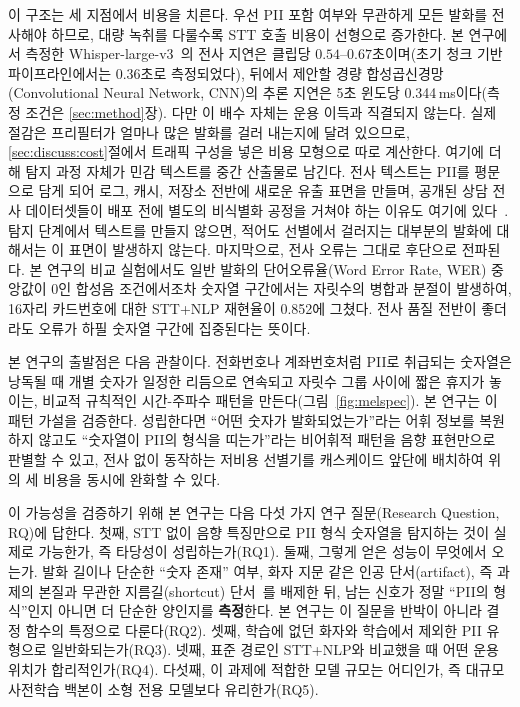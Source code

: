 \documentclass[11pt]{article}
\renewcommand{\emph}[1]{\textbf{#1}}
\begin{document}
이 구조는 세 지점에서 비용을 치른다. 우선 PII 포함 여부와 무관하게 모든 발화를 전사해야
하므로, 대량 녹취를 다룰수록 STT 호출 비용이 선형으로 증가한다. 본 연구에서 측정한
Whisper-large-v3~\cite{radford2023whisper}의 전사 지연은 클립당 $0.54$--$0.67$초이며(초기
청크 기반 파이프라인에서는 $0.36$초로 측정되었다), 뒤에서
제안할 경량 합성곱신경망(Convolutional Neural Network, CNN)의 추론 지연은 5초 윈도당
0.344\,ms이다(측정 조건은 \ref{sec:method}장). 다만 이 배수 자체는 운용 이득과 직결되지 않는다.
실제 절감은 프리필터가 얼마나 많은 발화를 걸러 내는지에 달려 있으므로,
\ref{sec:discuss:cost}절에서 트래픽 구성을 넣은 비용 모형으로 따로 계산한다. 여기에 더해 탐지 과정
자체가 민감 텍스트를 중간 산출물로 남긴다. 전사 텍스트는 PII를 평문으로 담게 되어 로그,
캐시, 저장소 전반에 새로운 유출 표면을 만들며, 공개된 상담 전사 데이터셋들이 배포 전에
별도의 비식별화 공정을 거쳐야 하는 이유도 여기에 있다~\cite{dao2025callcenter}. 탐지 단계에서
텍스트를 만들지 않으면, 적어도 선별에서 걸러지는 대부분의 발화에 대해서는 이 표면이
발생하지 않는다. 마지막으로, 전사 오류는 그대로 후단으로 전파된다. 본 연구의 비교 실험에서도
일반 발화의 단어오류율(Word Error Rate, WER) 중앙값이 0인 합성음 조건에서조차 숫자열
구간에서는 자릿수의 병합과 분절이 발생하여, 16자리 카드번호에 대한 STT+NLP 재현율이 0.852에
그쳤다. 전사 품질 전반이 좋더라도 오류가 하필 숫자열 구간에 집중된다는 뜻이다.

본 연구의 출발점은 다음 관찰이다. 전화번호나 계좌번호처럼 PII로 취급되는 숫자열은 낭독될 때
개별 숫자가 일정한 리듬으로 연속되고 자릿수 그룹 사이에 짧은 휴지가 놓이는, 비교적 규칙적인
시간-주파수 패턴을 만든다(그림~\ref{fig:melspec}). 본 연구는 이 패턴 가설을 검증한다.
성립한다면 ``어떤 숫자가 발화되었는가''라는 어휘 정보를 복원하지 않고도 ``숫자열이 PII의
형식을 띠는가''라는 비어휘적 패턴을 음향 표현만으로 판별할 수 있고, 전사 없이 동작하는 저비용
선별기를 캐스케이드 앞단에 배치하여 위의 세 비용을 동시에 완화할 수 있다.

이 가능성을 검증하기 위해 본 연구는 다음 다섯 가지 연구 질문(Research Question, RQ)에
답한다. 첫째, STT 없이 음향 특징만으로 PII 형식 숫자열을 탐지하는 것이 실제로 가능한가, 즉
타당성이 성립하는가(RQ1). 둘째, 그렇게 얻은 성능이 무엇에서 오는가. 발화 길이나 단순한
``숫자 존재'' 여부, 화자 지문 같은 인공 단서(artifact), 즉 과제의 본질과 무관한
지름길(shortcut) 단서~\cite{geirhos2020shortcut}를 배제한 뒤, 남는 신호가 정말 ``PII의
형식''인지 아니면 더 단순한 양인지를 \emph{측정}한다. 본 연구는 이 질문을 반박이 아니라
결정 함수의 특정으로 다룬다(RQ2). 셋째, 학습에 없던 화자와
학습에서 제외한 PII 유형으로 일반화되는가(RQ3). 넷째, 표준 경로인 STT+NLP와 비교했을 때 어떤
운용 위치가 합리적인가(RQ4). 다섯째, 이 과제에 적합한 모델 규모는 어디인가, 즉 대규모
사전학습 백본이 소형 전용 모델보다 유리한가(RQ5).
\end{document}
